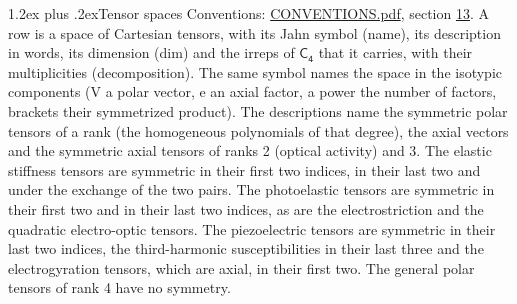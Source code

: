 \documentclass[10pt,a4paper]{article}
\makeatletter
\renewcommand\section{\@startsection{section}{1}{\z@}{-3ex plus -1ex minus -.2ex}%
  {1.2ex plus .2ex}{\normalfont\large\sffamily\bfseries\color{parttitle}}}
\numberwithin{equation}{section}
\newcommand{\grp}[1]{\mathsf{#1}}
\makeatother
\begin{document}
\section{Tensor spaces}\label{s:tensor_spaces}
Conventions: \href{../../CONVENTIONS.pdf}{CONVENTIONS.pdf}, section \href{../../CONVENTIONS.pdf\#conv.13}{13}.
\leavevmode\label{n:head.name}\label{n:head.description}\label{n:head.dim}\label{n:head.decomposition}A row is a space of Cartesian tensors, with its Jahn symbol (name), its description in words, its dimension (dim) and the irreps of $\grp{C_{4}}$ that it carries, with their multiplicities (decomposition). \label{n:label.jahn}The same symbol names the space in the isotypic components (V a polar vector, e an axial factor, a power the number of factors, brackets their symmetrized product). The descriptions name the symmetric polar tensors of a rank (the homogeneous polynomials of that degree), the axial vectors and the symmetric axial tensors of ranks 2 (optical activity) and 3. The elastic stiffness tensors are symmetric in their first two indices, in their last two and under the exchange of the two pairs. The photoelastic tensors are symmetric in their first two and in their last two indices, as are the electrostriction and the quadratic electro-optic tensors. The piezoelectric tensors are symmetric in their last two indices, the third-harmonic susceptibilities in their last three and the electrogyration tensors, which are axial, in their first two. The general polar tensors of rank 4 have no symmetry.
\end{document}
